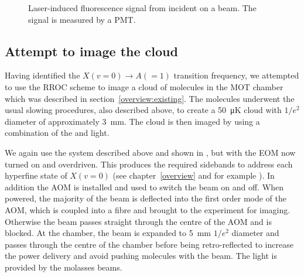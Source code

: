 \begin{figure}[htb]
  \centering
  \caption[Fluorescence from \CaF{} due to ]{
    Laser-induced fluorescence signal from  incident on a
  \CaF{} beam. The signal is measured by a PMT.}
  \label{exper:fig:beamresult}
\end{figure}

\subsection{Attempt to image the \CaF{} cloud}

Having identified the $X(v=0)\rightarrow A(=1)$ transition frequency, we
attempted to use the RROC scheme to image a cloud of \CaF{} molecules in the
MOT chamber which was described in section~\ref{overview:existing}. The
molecules underwent the usual slowing procedures, also described above, to
create a \SI{50}{\micro\kelvin} cloud with $1/e^2$ diameter of approximately
\SI{3}{\milli\meter}. The cloud is then imaged by using a combination of the
 and  light.

We again use the  system described above and shown in
, but with the EOM now turned on and
overdriven. This produces the required sidebands to address each hyperfine
state of $X(v=0)$ (see chapter~\ref{overview} and for example
). In addition the AOM is installed and used to switch
the beam on and off. When powered, the majority of the beam is deflected into
the first order mode of the AOM, which is coupled into a fibre and brought to
the experiment for imaging. Otherwise the beam passes straight through the
centre of the AOM and is blocked. At the chamber, the beam is expanded to
\SI{5}{\milli\meter} $1/e^2$ diameter and passes through the centre of the
chamber before being retro-reflected to increase the power delivery and avoid
pushing molecules with the beam. 
%
The  light is provided by the molasses beams.


